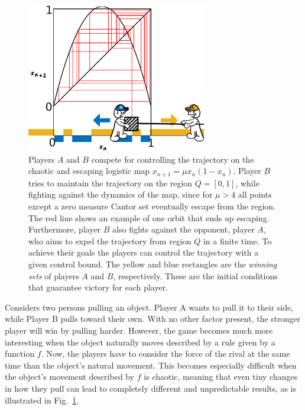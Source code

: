 \begin{figure}
    \centering
    \includegraphics[width=0.7\textwidth]{Images/P5/drawing.png}
    \caption{Players $A$ and $B$ compete for controlling the trajectory on the chaotic and escaping logistic map $x_{n+1} = \mu x_n(1-x_n)$. Player $B$ tries to maintain the trajectory on the region $Q = [0,1]$, while fighting against the dynamics of the map, since for $\mu > 4$ all points except a zero measure Cantor set eventually escape from the region. The red line shows an example of one orbit that ends up escaping. Furthermore, player $B$ also fights against the opponent, player $A$, who aims to expel the trajectory from region $Q$ in a finite time. To achieve their goals the players can control the trajectory with a given control bound. The yellow and blue rectangles are the \textit{winning sets} of players $A$ and $B$, respectively. These are the initial conditions that guarantee victory for each player.}
    \label{fig:drawing}
\end{figure}





Considers two persons pulling an object. Player A wants to pull it to their side, while Player B
pulls toward their own. With no other factor present, the stronger player will
win by pulling harder. However, the game becomes much more interesting when the object naturally moves
described by a rule given by a function $f$. Now, the players have to consider the force of the rival at the same time than the object's natural movement. This becomes especially difficult when the object's movement described by $f$ is chaotic, meaning that even tiny changes in how they pull can lead to completely different and unpredictable results, as is illustrated in Fig.~\ref{fig:drawing}.

